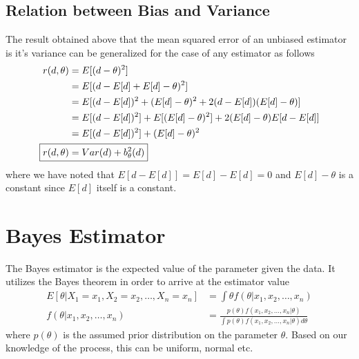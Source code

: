 \documentclass[../probability-notes.tex]{subfiles}
\begin{document}
    \subsection{Relation between Bias and Variance}
    The result obtained above that the mean squared error of an unbiased estimator is it's variance can be generalized for the case of any estimator as follows
    \begin{align*}
        r(d, \theta) &= E[(d - \theta)^{2}]\\
        &= E[(d - E[d] + E[d] -\theta)^{2}]\\
        &= E[(d - E[d])^{2} + (E[d] - \theta)^{2} + 2(d - E[d])(E[d] - \theta)]\\
        &= E[(d - E[d])^{2}] + E[(E[d] - \theta)^{2}] + 2(E[d] - \theta)E[d - E[d]]\\
        &= E[(d - E[d])^{2}] + (E[d] - \theta)^{2}\\
        \Aboxed{r(d, \theta) &= Var(d) + b_{\theta}^{2}(d)}\\
    \end{align*}
    where we have noted that $E[d - E[d]] = E[d] - E[d] = 0$ and $E[d] - \theta$ is a constant since $E[d]$ itself is a constant.


    \section{Bayes Estimator}
    The Bayes estimator is the expected value of the parameter given the data. It utilizes the Bayes theorem in order to arrive at the estimator value
    \begin{align*}
        E[\theta|X_{1} = x_{1}, X_{2} = x_{2}, \ldots, X_{n} = x_{n}] &= \int \theta f(\theta|x_{1}, x_{2}, \ldots, x_{n})\\
        f(\theta|x_{1}, x_{2}, \ldots, x_{n}) &= \frac{p(\theta) f(x_{1}, x_{2}, \ldots, x_{n} | \theta)}{\int p(\theta) f(x_{1}, x_{2}, \ldots, x_{n} | \theta) d\theta}
    \end{align*}
    where $p(\theta)$ is the assumed prior distribution on the parameter $\theta$. Based on our knowledge of the process, this can be uniform, normal etc.
\end{document}
